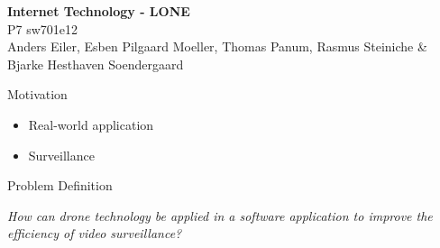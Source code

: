 \begin{frame}{}
	\begin{center}
		\huge \textbf{Internet Technology - LONE}\\
		\normalsize P7 sw701e12\\
		\tiny{Anders Eiler, Esben Pilgaard Moeller, Thomas Panum,}
		\tiny{Rasmus Steiniche \& Bjarke Hesthaven Soendergaard}
	\end{center}
\end{frame}

\begin{frame}{Motivation}
\begin{itemize}
	\item Real-world application
	\item Surveillance
\end{itemize}
\end{frame}

\begin{frame}{Problem Definition}
\begin{center}
	\textit{How can drone technology be applied in a software application to improve the efficiency of video surveillance?}
\end{center}
\end{frame}